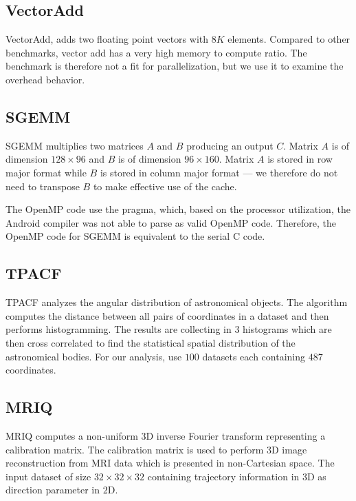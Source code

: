 \subsection{VectorAdd}

VectorAdd, adds two floating point vectors with $8K$ elements.
Compared to other benchmarks, vector add has a very high memory to compute ratio.
The benchmark is therefore not a fit for parallelization, but we use it to examine
  the overhead behavior.

\subsection{SGEMM}

SGEMM multiplies two matrices $A$ and $B$ producing an output $C$.
Matrix $A$ is of dimension $128 \times 96$ and $B$ is of dimension $96 \times 160$.
Matrix $A$ is stored in row major format while $B$ is stored in column major format ---
	we therefore do not need to transpose $B$ to make effective use of the cache.

The OpenMP code use the 
	pragma, which, based on the processor utilization,
	the Android compiler was not able to parse as valid OpenMP code.
Therefore, the OpenMP code for SGEMM is equivalent to the serial C code.

\subsection{TPACF}

TPACF analyzes the angular distribution of astronomical objects.
The algorithm computes the distance between all pairs of coordinates in a dataset
	and then performs histogramming.
The results are collecting in 3 histograms which are then cross correlated to find
	the statistical spatial distribution of the astronomical bodies.
For our analysis, use $100$ datasets each containing $487$ coordinates.

\subsection{MRIQ}

MRIQ computes a non-uniform 3D inverse Fourier transform representing a calibration matrix.
The calibration matrix is used to perform 3D image reconstruction from MRI data which is 
	presented in non-Cartesian space.
The input dataset of size $32 \times 32 \times 32$ containing trajectory information in $3$D
	as direction parameter in $2$D.

